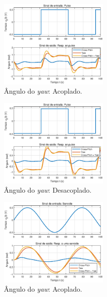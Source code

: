 \begin{figure}[H]
    \centering
    \includegraphics[width=0.48\textwidth]{figures/Desacoplamento/Yaw_Acoplado_Pulso.eps}
    \caption{Ângulo do \textit{yaw}: Acoplado.}
    \label{fig:YawAcopladoPulso}
\end{figure}

\begin{figure}[H]
    \centering
    \includegraphics[width=0.48\textwidth]{figures/Desacoplamento/Yaw_Desacoplado_Pulso.eps}
    \caption{Ângulo do \textit{yaw}: Desacoplado.}
    \label{fig:YawDesacopladoPulso}
\end{figure}


\begin{figure}[H]
    \centering
    \includegraphics[width=0.48\textwidth]{figures/Desacoplamento/Yaw_Acoplado_Senoide.eps}
    \caption{Ângulo do \textit{yaw}: Acoplado.}
    \label{fig:YawAcopladoSenoide}
\end{figure}

